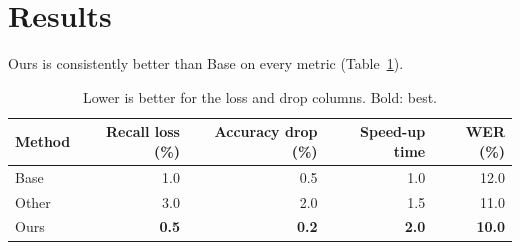\documentclass{article}\usepackage{booktabs}
\begin{document}
\section{Results}
Ours is consistently better than Base on every metric (Table~\ref{tab:a}).
\begin{table}[h]\centering\caption{Lower is better for the loss and drop columns. Bold: best.}\label{tab:a}
\begin{tabular}{lrrrr}
\toprule
Method & Recall loss (\%) & Accuracy drop (\%) & Speed-up time & WER (\%) \\
\midrule
Base & 1.0 & 0.5 & 1.0 & 12.0 \\
Other & 3.0 & 2.0 & 1.5 & 11.0 \\
Ours & \textbf{0.5} & \textbf{0.2} & \textbf{2.0} & \textbf{10.0} \\
\bottomrule
\end{tabular}\end{table}
\end{document}
